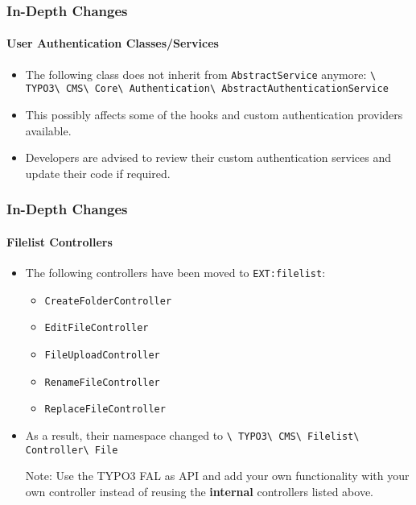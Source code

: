 \begin{frame}[fragile]
	\frametitle{In-Depth Changes}
	\framesubtitle{User Authentication Classes/Services}

	\begin{itemize}

		\item The following class does not inherit from
			\smaller\texttt{AbstractService}\normalsize\hspace{0.1cm}
			anymore:
			\smaller\texttt{\textbackslash
				TYPO3\textbackslash
				CMS\textbackslash
				Core\textbackslash
				Authentication\textbackslash
				AbstractAuthenticationService}\normalsize

		\item This possibly affects some of the hooks and custom authentication providers available.

		\item Developers are advised to review their custom authentication services and update
			their code if required.

	\end{itemize}

\end{frame}


\begin{frame}[fragile]
	\frametitle{In-Depth Changes}
	\framesubtitle{Filelist Controllers}

	\begin{itemize}
		\item The following controllers have been moved to \texttt{EXT:filelist}:

			\begin{itemize}\small
				\item \texttt{CreateFolderController}
				\item \texttt{EditFileController}
				\item \texttt{FileUploadController}
				\item \texttt{RenameFileController}
				\item \texttt{ReplaceFileController}
			\end{itemize}\normalsize

		\item As a result, their namespace changed to\newline
			\texttt{\textbackslash
				TYPO3\textbackslash
				CMS\textbackslash
				Filelist\textbackslash
				Controller\textbackslash
				File}

		\vspace{0.2cm}

		\small
			Note: Use the TYPO3 FAL as API and add your own functionality
			with your own controller instead of reusing the \textbf{internal}
			controllers listed above.
		\normalsize

	\end{itemize}

\end{frame}

